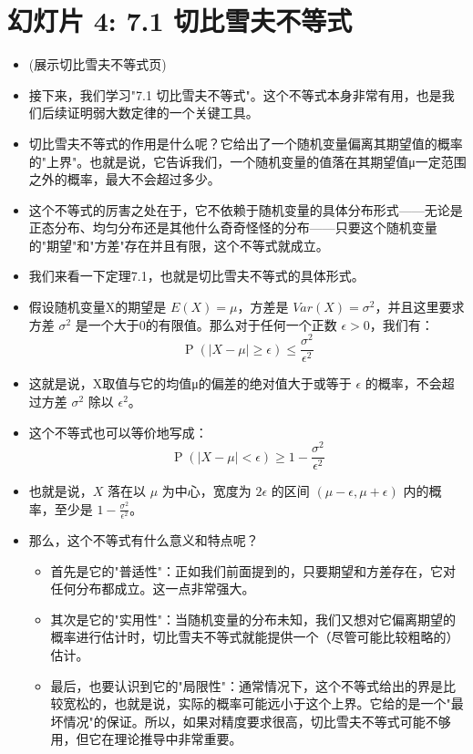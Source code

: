 \documentclass[UTF8]{article} %
\DeclareMathOperator{\Prob}{\operatorname{P}}
\begin{document}
\section*{幻灯片 4: 7.1 切比雪夫不等式}
\begin{itemize}
    \itemsep1em
    \item (展示切比雪夫不等式页)
    \item 接下来，我们学习"7.1 切比雪夫不等式"。这个不等式本身非常有用，也是我们后续证明弱大数定律的一个关键工具。
    \item 切比雪夫不等式的作用是什么呢？它给出了一个随机变量偏离其期望值的概率的"上界"。也就是说，它告诉我们，一个随机变量的值落在其期望值μ一定范围之外的概率，最大不会超过多少。
    \item 这个不等式的厉害之处在于，它不依赖于随机变量的具体分布形式——无论是正态分布、均匀分布还是其他什么奇奇怪怪的分布——只要这个随机变量的"期望"和"方差"存在并且有限，这个不等式就成立。
    \item 我们来看一下定理7.1，也就是切比雪夫不等式的具体形式。
    \item 假设随机变量X的期望是 $E(X) = \mu$，方差是 $Var(X) = \sigma^2$，并且这里要求方差 $\sigma^2$ 是一个大于0的有限值。那么对于任何一个正数 $\epsilon > 0$，我们有：
    \[ \Prob(|X - \mu| \geq \epsilon) \leq \frac{\sigma^2}{\epsilon^2} \]
    \item 这就是说，X取值与它的均值μ的偏差的绝对值大于或等于 $\epsilon$ 的概率，不会超过方差 $\sigma^2$ 除以 $\epsilon^2$。
    \item 这个不等式也可以等价地写成：
    \[ \Prob(|X - \mu| < \epsilon) \geq 1 - \frac{\sigma^2}{\epsilon^2} \]
    \item 也就是说，$X$ 落在以 $\mu$ 为中心，宽度为 $2\epsilon$ 的区间 $(\mu-\epsilon, \mu+\epsilon)$ 内的概率，至少是 $1 - \frac{\sigma^2}{\epsilon^2}$。
    \item 那么，这个不等式有什么意义和特点呢？
    \begin{itemize}[label=\textbullet, itemsep=0.5em]
        \item 首先是它的"普适性"：正如我们前面提到的，只要期望和方差存在，它对任何分布都成立。这一点非常强大。
        \item 其次是它的"实用性"：当随机变量的分布未知，我们又想对它偏离期望的概率进行估计时，切比雪夫不等式就能提供一个（尽管可能比较粗略的）估计。
        \item 最后，也要认识到它的"局限性"：通常情况下，这个不等式给出的界是比较宽松的，也就是说，实际的概率可能远小于这个上界。它给的是一个"最坏情况"的保证。所以，如果对精度要求很高，切比雪夫不等式可能不够用，但它在理论推导中非常重要。
    \end{itemize}
\end{itemize}
\end{document}
